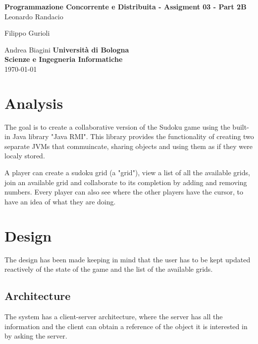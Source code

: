\documentclass[12pt, a4paper]{report}
\begin{document}
\renewcommand\bibname{References} %


\begin{titlepage}

\begin{center}

\Large \textbf {Programmazione Concorrente e Distribuita - Assigment 03 - Part 2B}\\%
\vspace{1em}%
\vfill
Leonardo Randacio


Filippo Gurioli


Andrea Biagini
\vspace{1em}
\vfill
{\bf Università di Bologna \\ Scienze e Ingegneria Informatiche}\\[0.5in]

       
\vfill
\today

\end{center}

\end{titlepage}


\tableofcontents
\listoffigures

\newpage
{} %

\chapter{Analysis}
The goal is to create a collaborative version of the Sudoku game using the 
 built-in Java library "Java RMI". This library provides the functionality 
 of creating two separate JVMs that commuincate, sharing objects and using them as
 if they were localy stored.

A player can create a sudoku grid (a "grid"), view a list of all the
 available grids, join an available grid and collaborate to its completion
 by adding and removing numbers. Every player can also see where the other
 players have the cursor, to have an idea of what they are doing.

\chapter{Design}
The design has been made keeping in mind that the user has to be kept updated
 reactively of the state of the game and the list of the available grids.

\section{Architecture}
The system has a client-server architecture, where the server has all the
 information and the client can obtain a reference of the object it is
 interested in by asking the server.
\end{document}
